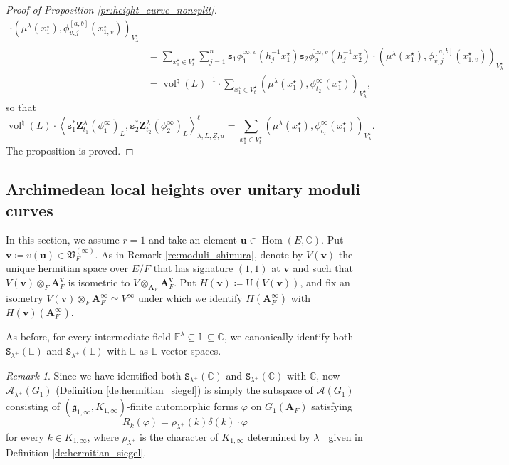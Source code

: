 \documentclass[12pt]{amsart}
\numberwithin{equation}{section}
\theoremstyle{plain}
\theoremstyle{definition}
\theoremstyle{remark}
\newtheorem{remark}[proposition]{Remark}
\renewcommand{\b}[1]{\mathbf{#1}}
\renewcommand{\c}[1]{\mathcal{#1}}
\renewcommand{\d}[1]{\mathbb{#1}}
\newcommand{\f}[1]{\mathfrak{#1}}
\renewcommand{\r}[1]{\mathrm{#1}}
\renewcommand{\(}{\left(}
\renewcommand{\)}{\right)}
\newcommand{\ol}[1]{\overline{#1}{}}
\newcommand{\ul}{\underline}
\newcommand{\bA}{\b A}
\newcommand{\cA}{\c A}
\newcommand{\dC}{\d C}
\newcommand{\dE}{\d E}
\newcommand{\dL}{\d L}
\newcommand{\fV}{\f V}
\newcommand{\fg}{\f g}
\newcommand{\rU}{\r U}
\newcommand{\tS}{\mathtt{S}}
\newcommand{\ts}{\mathtt{s}}
\newcommand{\bbu}{\boldsymbol{u}}
\newcommand{\bbv}{\boldsymbol{v}}
\newcommand{\bbZ}{\boldsymbol{Z}}
\newcommand{\llangle}{\left\langle}
\newcommand{\rrangle}{\right\rangle}
\DeclareMathOperator{\Hom}{Hom}
\DeclareMathOperator{\vol}{vol}
\begin{document}
\begin{proof}[Proof of Proposition \ref{pr:height_curve_nonsplit}]
\begin{align*}
\cdot(\mu^\lambda(x^\star_1),\phi^{[a,b]}_{v,j}(x^\star_{1,v}))_{V^\star_\lambda} \\
&=\sum_{x^\star_1\in V^\star_t}\sum_{j=1}^n\ts_1\phi^{\infty,v}_1(h_j^{-1}x^\star_1)\ol{\ts_2\phi^{\infty,v}_2}(h_j^{-1}x^\star_2)
\cdot(\mu^\lambda(x^\star_1),\phi^{[a,b]}_{v,j}(x^\star_{1,v}))_{V^\star_\lambda} \\
&=\vol^\natural(L)^{-1}\cdot\sum_{x^\star_1\in V^\star_t}(\mu^\lambda(x^\star_1),\phi^\infty_{t_2}(x^\star_1))_{V^\star_\lambda},
\end{align*}
so that
\[
\vol^\natural(L)\cdot
\llangle\ts_1^*\bbZ^\lambda_{t_1}(\phi^\infty_1)_L,
\ts_2^*\bbZ^\lambda_{t_2}(\phi^\infty_2)_L\rrangle_{\lambda,L,\ul{Z},u}^\ell=
\sum_{x^\star_1\in V^\star_t}(\mu^\lambda(x^\star_1),\phi^\infty_{t_2}(x^\star_1))_{V^\star_\lambda}.
\]
The proposition is proved.
\end{proof}





\subsection{Archimedean local heights over unitary moduli curves}
\label{ss:height_curve_archimedean}

In this section, we assume $r=1$ and take an element $\bbu\in\Hom(E,\dC)$. Put $\bbv\coloneqq v(\bbu)\in\fV_F^{(\infty)}$. As in Remark \ref{re:moduli_shimura}, denote by $V(\bbv)$ the unique hermitian space over $E/F$ that has signature $(1,1)$ at $\bbv$ and such that $V(\bbv)\otimes_F\bA_F^{\bbv}$ is isometric to $V\otimes_{\bA_F}\bA_F^{\bbv}$. Put $H(\bbv)\coloneqq\rU(V(\bbv))$, and fix an isometry $V(\bbv)\otimes_F\bA_F^\infty\simeq V^\infty$ under which we identify $H(\bA_F^\infty)$ with $H(\bbv)(\bA_F^\infty)$.

As before, for every intermediate field $\dE^\lambda\subseteq\dL\subseteq\dC$, we canonically identify both $\tS_{\lambda^+}(\dL)$ and $\ol{\tS_{\lambda^+}(\dL)}$ with $\dL$ as $\dL$-vector spaces.


\begin{remark}\label{re:hermitian_siegel}
Since we have identified both $\tS_{\lambda^+}(\dC)$ and $\ol{\tS_{\lambda^+}(\dC)}$ with $\dC$, now $\cA_{\lambda^+}(G_1)$ (Definition \ref{de:hermitian_siegel}) is simply the subspace of $\cA(G_1)$ consisting of $(\fg_{1,\infty},K_{1,\infty})$-finite automorphic forms $\varphi$ on $G_1(\bA_F)$ satisfying
\[
R_k(\varphi)=\rho_{\lambda^+}(k)\delta(k)\cdot\varphi
\]
for every $k\in K_{1,\infty}$, where $\rho_{\lambda^+}$ is the character of $K_{1,\infty}$ determined by $\lambda^+$ given in Definition \ref{de:hermitian_siegel}.
\end{remark}
\end{document}
